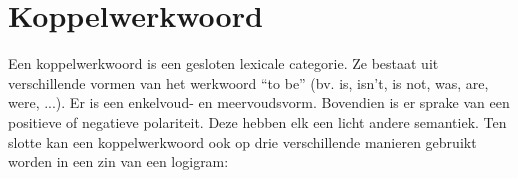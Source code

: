 


\section{Koppelwerkwoord}
Een koppelwerkwoord is een gesloten lexicale categorie. Ze bestaat uit verschillende vormen van het werkwoord ``to be'' (bv. is, isn't, is not, was, are, were, ...). Er is een enkelvoud- en meervoudsvorm. Bovendien is er sprake van een positieve of negatieve polariteit. Deze hebben elk een licht andere semantiek. Ten slotte kan een koppelwerkwoord ook op drie verschillende manieren gebruikt worden in een zin van een logigram:

